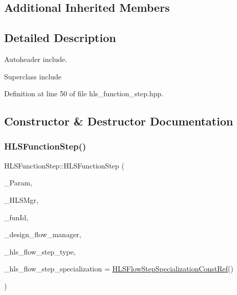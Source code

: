 \subsection*{Additional Inherited Members}


\subsection{Detailed Description}
Autoheader include. 

Superclass include 

Definition at line 50 of file hls\+\_\+function\+\_\+step.\+hpp.



\subsection{Constructor \& Destructor Documentation}
\mbox{\label{classHLSFunctionStep_a82817efb94f0eae6d614bbcec1c99293}} 
\subsubsection{\texorpdfstring{H\+L\+S\+Function\+Step()}{HLSFunctionStep()}}
{\footnotesize\ttfamily H\+L\+S\+Function\+Step\+::\+H\+L\+S\+Function\+Step (\begin{DoxyParamCaption}\item[{const \hyperlink{Parameter_8hpp_a37841774a6fcb479b597fdf8955eb4ea}{Parameter\+Const\+Ref}}]{\+\_\+\+Param,  }\item[{const \hyperlink{hls__manager_8hpp_acd3842b8589fe52c08fc0b2fcc813bfe}{H\+L\+S\+\_\+manager\+Ref}}]{\+\_\+\+H\+L\+S\+Mgr,  }\item[{unsigned int}]{\+\_\+fun\+Id,  }\item[{const Design\+Flow\+Manager\+Const\+Ref}]{\+\_\+design\+\_\+flow\+\_\+manager,  }\item[{const \hyperlink{hls__step_8hpp_ada16bc22905016180e26fc7e39537f8d}{H\+L\+S\+Flow\+Step\+\_\+\+Type}}]{\+\_\+hls\+\_\+flow\+\_\+step\+\_\+type,  }\item[{const \hyperlink{hls__step_8hpp_a5fdd2edf290c196531d21d68e13f0e74}{H\+L\+S\+Flow\+Step\+Specialization\+Const\+Ref}}]{\+\_\+hls\+\_\+flow\+\_\+step\+\_\+specialization = {\ttfamily \hyperlink{hls__step_8hpp_a5fdd2edf290c196531d21d68e13f0e74}{H\+L\+S\+Flow\+Step\+Specialization\+Const\+Ref}()} }\end{DoxyParamCaption})}



